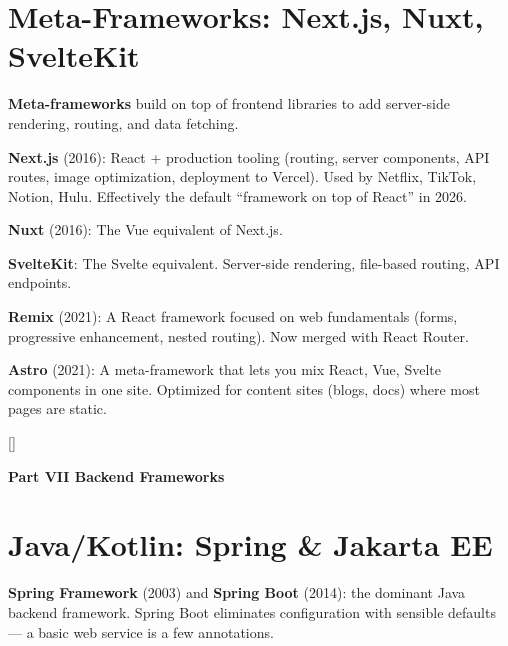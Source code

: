 \documentclass[11pt, letterpaper]{article}
\newcommand{\brownsections}{%
  \titleformat{\section}{\large\bfseries\color{sectionbrown}}{}{0em}{}[\color{sectionbrown}\titlerule]%
  \titleformat{\subsection}{\normalsize\bfseries\color{sectionbrown!80!black}}{}{0em}{}%
}
\newcommand{\partbanner}[3]{%
  \begin{tcolorbox}[colback=#1, colframe=#2, boxrule=1.2pt, arc=4pt,
    left=8pt, right=8pt, top=6pt, bottom=6pt]
    \begin{center}{\LARGE\bfseries #3}\end{center}
  \end{tcolorbox}%
}
\begin{document}
\section*{Meta-Frameworks: Next.js, Nuxt, SvelteKit}

\textbf{Meta-frameworks} build on top of frontend libraries to add server-side rendering, routing, and data fetching.

\textbf{Next.js} (2016): React + production tooling (routing, server components, API routes, image optimization, deployment to Vercel). Used by Netflix, TikTok, Notion, Hulu. Effectively the default ``framework on top of React'' in 2026.

\textbf{Nuxt} (2016): The Vue equivalent of Next.js.

\textbf{SvelteKit}: The Svelte equivalent. Server-side rendering, file-based routing, API endpoints.

\textbf{Remix} (2021): A React framework focused on web fundamentals (forms, progressive enhancement, nested routing). Now merged with React Router.

\textbf{Astro} (2021): A meta-framework that lets you mix React, Vue, Svelte components in one site. Optimized for content sites (blogs, docs) where most pages are static.

\newpage

\brownsections
{}
\partbanner{part8bg}{sectionbrown}{Part VII \quad Backend Frameworks}

\vspace{8pt}

\section*{Java/Kotlin: Spring \& Jakarta EE}

\textbf{Spring Framework} (2003) and \textbf{Spring Boot} (2014): the dominant Java backend framework. Spring Boot eliminates configuration with sensible defaults --- a basic web service is a few annotations.
\end{document}
